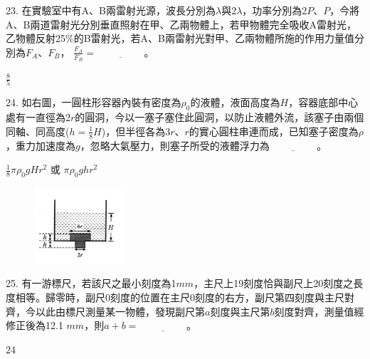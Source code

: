 \documentclass[cn,10pt,math=newtx]{elegantbook}
\begin{document}
\begin{example}
   23. 在實驗室中有A、B兩雷射光源，波長分別為$\lambda$與2$\lambda$，功率分別為2$P$、$P$，今將A、B兩道雷射光分別垂直照射在甲、乙兩物體上，若甲物體完全吸收A雷射光，乙物體反射25$\%$的B雷射光，若A、B兩雷射光對甲、乙兩物體所施的作用力量值分別為$F_A、F_B$， $\frac{F_A}{F_B}=\underline{\hspace{2cm}}$。\\
    \rightline{[桃園高中教甄109]}
\end{example}
\begin{solution}
    $\frac{8}{5}$
\end{solution}

\newpage

\begin{example}
   24. 如右圖，一圓柱形容器內裝有密度為$\rho_0$的液體，液面高度為$H$，容器底部中心處有一直徑為2$r$的圓洞，今以一塞子塞住此圓洞，以防止液體外流，該塞子由兩個同軸、同高度($h=\frac{1}{8}H$)，但半徑各為3$r$、$r$的實心圓柱串連而成，已知塞子密度為$\rho$，重力加速度為$g$，忽略大氣壓力，則塞子所受的液體浮力為$\underline{\hspace{2cm}}$。\\
    \rightline{[桃園高中教甄109]}
\end{example}
\begin{solution}
    $\frac{1}{8} \pi \rho_0 gHr^2$ 或 $\pi \rho_0 ghr^2$
\end{solution}
\begin{figure}[htbp]
    \flushright
    \includegraphics[width=0.3\textwidth]{image/109桃園24.png}
  \end{figure}
\newpage

\begin{example}
   25. 有一游標尺，若該尺之最小刻度為1$mm$，主尺上19刻度恰與副尺上20刻度之長度相等。歸零時，副尺0刻度的位置在主尺0刻度的右方，副尺第四刻度與主尺對齊，今以此由標尺測量某一物體，發現副尺第$a$刻度與主尺第$b$刻度對齊，測量值經修正後為12.1 $mm$，則$a+b=\underline{\hspace{2cm}}$。\\
    \rightline{[桃園高中教甄109]}
\end{example}
\begin{solution}
    $24$
\end{solution}
\end{document}
